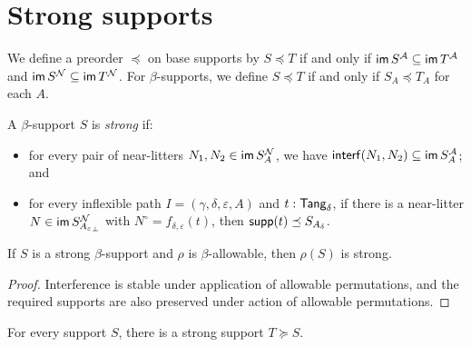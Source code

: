 \section{Strong supports}
\begin{definition}
  \label{def:StrSupport.Occurs}
  \leanok
  We define a preorder \( \preceq \) on base supports by \( S \preceq T \) if and only if \( \operatorname{\mathsf{im}} S^{\mathcal A} \subseteq \operatorname{\mathsf{im}} T^{\mathcal A} \) and \( \operatorname{\mathsf{im}} S^{\mathcal N} \subseteq \operatorname{\mathsf{im}} T^{\mathcal N} \).
  For \( \beta \)-supports, we define \( S \preceq T \) if and only if \( S_A \preceq T_A \) for each \( A \).
\end{definition}
\begin{definition}
  \label{def:Strong}
  \leanok
  A \( \beta \)-support \( S \) is \emph{strong} if:
  \begin{itemize}
    \item for every pair of near-litters \( N_1, N_2 \in \operatorname{\mathsf{im}} S_A^{\mathcal N} \), we have \( \operatorname{\mathsf{interf}}(N_1, N_2) \subseteq \operatorname{\mathsf{im}} S_A^{\mathcal A} \); and
    \item for every inflexible path \( I = (\gamma,\delta,\varepsilon,A) \) and \( t : \mathsf{Tang}_\delta \), if there is a near-litter \( N \in \operatorname{\mathsf{im}} S_{{A_\varepsilon}_\bot}^{\mathcal N} \) with \( N^\circ = f_{\delta,\varepsilon}(t) \), then \( \operatorname{\mathsf{supp}}(t) \preceq S_{A_\delta} \).
  \end{itemize}
\end{definition}
\begin{proposition}
  \label{prop:Strong.smul}
  \leanok
  If \( S \) is a strong \( \beta \)-support and \( \rho \) is \( \beta \)-allowable, then \( \rho(S) \) is strong.
\end{proposition}
\begin{proof}
  \leanok
  Interference is stable under application of allowable permutations, and the required supports are also preserved under action of allowable permutations.
\end{proof}
\begin{proposition}
  \label{prop:exists_strong}
  \leanok
  For every support \( S \), there is a strong support \( T \succeq S \).
\end{proposition}
